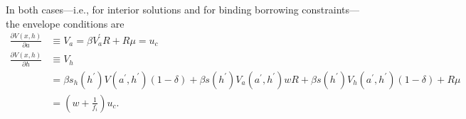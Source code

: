\documentclass[a4paper,12pt]{article}
\begin{document}
In both cases---i.e., for interior solutions and for binding borrowing constraints---the envelope conditions are
\begin{align*}
	\frac{\partial V\left(x,h\right)} {\partial a}  &  \equiv V_{a} = \beta V_{a}^{\prime} R + R \mu = u_{c}  \\
	\frac{\partial V\left(x,h\right)} {\partial h}  &  \equiv V_{h}  \\
	&  = \beta s_{h}\left(h^{\prime}\right) V(a^{\prime},h^{\prime}) \left(1 - \delta\right) +\beta s\left(h^{\prime}\right) V_{a}(a^{\prime},h^{\prime}) w R + \beta s\left(h^{\prime}\right) V_{h}(a^{\prime},h^{\prime}) \left(1 - \delta\right) + R \mu \\
	&  = \left(w + \frac{1} {f_{i}}\right) u_{c}.
\end{align*}

\clearpage
\newpage



\end{document}
